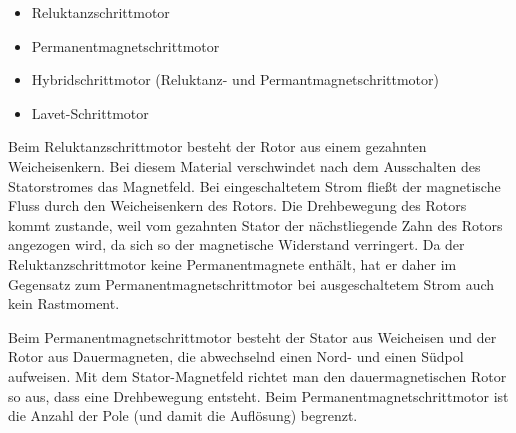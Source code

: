 \begin{description}[leftmargin=3cm]
							\item[Bauarten]
							\begin{itemize}
								\item Reluktanzschrittmotor
								\item Permanentmagnetschrittmotor
								\item Hybridschrittmotor (Reluktanz- und Permantmagnetschrittmotor)
								\item Lavet-Schrittmotor
							\end{itemize}
						
							\item[Reluktanzschrittmotor]
							Beim Reluktanzschrittmotor besteht der Rotor aus einem gezahnten Weicheisenkern. Bei diesem Material verschwindet nach dem Ausschalten des Statorstromes das Magnetfeld. Bei eingeschaltetem Strom fließt der magnetische Fluss durch den Weicheisenkern des Rotors. Die Drehbewegung des Rotors kommt zustande, weil vom gezahnten Stator der nächstliegende Zahn des Rotors angezogen wird, da sich so der magnetische Widerstand verringert. Da der Reluktanzschrittmotor keine Permanentmagnete enthält, hat er daher im Gegensatz zum Permanentmagnetschrittmotor bei ausgeschaltetem Strom auch kein Rastmoment.
							
							\item[Permanentmagnetschrittmotor]
							Beim Permanentmagnetschrittmotor besteht der Stator aus Weicheisen und der Rotor aus Dauermagneten, die abwechselnd einen Nord- und einen Südpol aufweisen. Mit dem Stator-Magnetfeld richtet man den dauermagnetischen Rotor so aus, dass eine Drehbewegung entsteht. Beim Permanentmagnetschrittmotor ist die Anzahl der Pole (und damit die Auflösung) begrenzt.
							

\end{description}
